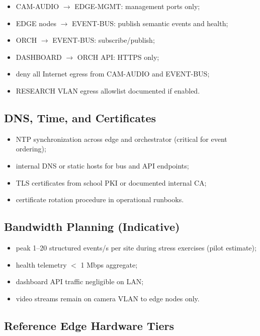 \begin{itemize}[noitemsep]
  \item CAM-AUDIO $\rightarrow$ EDGE-MGMT: management ports only;
  \item EDGE nodes $\rightarrow$ EVENT-BUS: publish semantic events and health;
  \item ORCH $\rightarrow$ EVENT-BUS: subscribe/publish;
  \item DASHBOARD $\rightarrow$ ORCH API: HTTPS only;
  \item deny all Internet egress from CAM-AUDIO and EVENT-BUS;
  \item RESEARCH VLAN egress allowlist documented if enabled.
\end{itemize}

\subsection{DNS, Time, and Certificates}

\begin{itemize}[noitemsep]
  \item NTP synchronization across edge and orchestrator (critical for event ordering);
  \item internal DNS or static hosts for bus and API endpoints;
  \item TLS certificates from school PKI or documented internal CA;
  \item certificate rotation procedure in operational runbooks.
\end{itemize}

\subsection{Bandwidth Planning (Indicative)}

\begin{itemize}[noitemsep]
  \item peak 1--20 structured events/s per site during stress exercises (pilot estimate);
  \item health telemetry $<$ 1 Mbps aggregate;
  \item dashboard API traffic negligible on LAN;
  \item video streams remain on camera VLAN to edge nodes only.
\end{itemize}

\subsection{Reference Edge Hardware Tiers}

